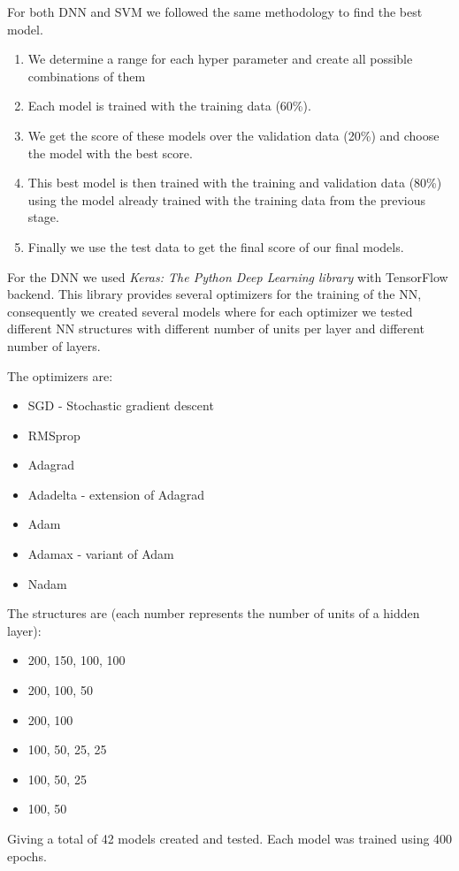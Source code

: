 \documentclass[journal, a4paper]{IEEEtran}
\begin{document}
    For both DNN and SVM we followed the same methodology to find the best model.
    \begin{enumerate}
      \item We determine a range for each hyper parameter and create all possible 
        combinations of them
      \item Each model is trained with the training data (60\%).
      \item We get the score of these models over the validation data (20\%) and choose
        the model with the best score.
      \item This best model is then trained with the training and validation data 
        (80\%) using the model already trained with the training data from the previous 
        stage.
      \item Finally we use the test data to get the final score of our final models.
    \end{enumerate}
    For the DNN we used \textit{Keras: The Python Deep Learning library} with 
TensorFlow backend. This library provides several optimizers for the training of the NN, consequently
we created several models where for each optimizer we tested different NN structures with
different number of units per layer and different number of layers.

    The optimizers are:
    \begin{itemize}
      \item SGD - Stochastic gradient descent
      \item RMSprop
      \item Adagrad
      \item Adadelta - extension of Adagrad \cite{adadelta}
      \item Adam \cite{adam}
      \item Adamax - variant of Adam \cite{adam}
      \item Nadam \cite{nadam}
    \end{itemize}
    The structures are (each number represents the number of units of a hidden layer):
    \begin{itemize}
      \item 200, 150, 100, 100
      \item 200, 100, 50
      \item 200, 100
      \item 100, 50,  25,  25
      \item 100, 50,  25
      \item 100, 50
    \end{itemize}
    Giving a total of 42 models created and tested. Each model was trained using 400 epochs.
\end{document}
